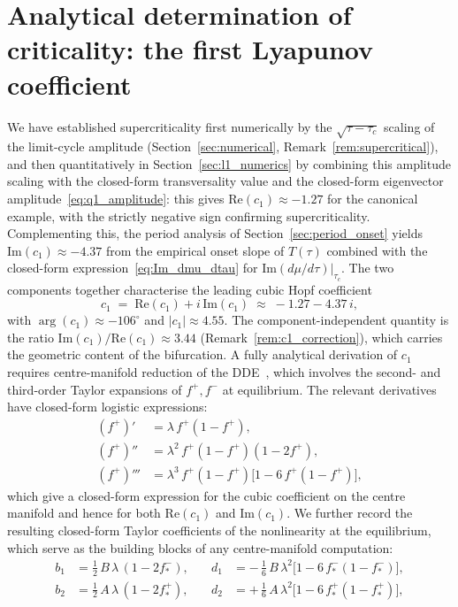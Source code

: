\documentclass[sn-mathphys,Numbered]{sn-jnl}
\theoremstyle{thmstyleone}
\theoremstyle{thmstyletwo}
\theoremstyle{thmstylethree}
\begin{document}
\section{Analytical determination of criticality: the first Lyapunov coefficient}
\label{sec:analytical_supercrit}

We have established supercriticality first numerically by the
$\sqrt{\tau-\tau_c}$ scaling of the limit-cycle amplitude
(Section~\ref{sec:numerical}, Remark~\ref{rem:supercritical}), and then
quantitatively in Section~\ref{sec:l1_numerics} by combining this
amplitude scaling with the closed-form transversality value and the
closed-form eigenvector amplitude~\eqref{eq:q1_amplitude}: this gives
$\mathrm{Re}(c_1)\approx -1.27$ for the canonical example, with the
strictly negative sign confirming supercriticality. Complementing this,
the period analysis of Section~\ref{sec:period_onset} yields
$\mathrm{Im}(c_1)\approx -4.37$ from the empirical onset slope of
$T(\tau)$ combined with the closed-form expression~\eqref{eq:Im_dmu_dtau}
for $\mathrm{Im}(d\mu/d\tau)|_{\tau_c}$. The two components together
characterise the leading cubic Hopf coefficient
\[
c_1 \;=\; \mathrm{Re}(c_1) + i\,\mathrm{Im}(c_1)
\;\approx\; -1.27 - 4.37\,i,
\]
with $\arg(c_1)\approx -106^\circ$ and $|c_1|\approx 4.55$. The
component-independent quantity is the ratio
$\mathrm{Im}(c_1)/\mathrm{Re}(c_1)\approx 3.44$
(Remark~\ref{rem:c1_correction}), which carries the geometric content
of the bifurcation. A fully analytical derivation of $c_1$ requires
centre-manifold reduction of the
DDE~\cite{hassard1981theory,kuang1993delay}, which involves the second-
and third-order Taylor expansions of $f^+,f^-$ at equilibrium. The
relevant derivatives have closed-form logistic expressions:
\begin{equation}
\begin{aligned}
(f^+)' &= \lambda\, f^+(1-f^+),\\
(f^+)'' &= \lambda^2\, f^+(1-f^+)(1-2 f^+),\\
(f^+)''' &= \lambda^3\, f^+(1-f^+)\bigl[1 - 6\,f^+(1-f^+)\bigr],
\end{aligned}
\label{eq:logistic_derivs}
\end{equation}
which give a closed-form expression for the cubic coefficient on the
centre manifold and hence for both $\mathrm{Re}(c_1)$ and
$\mathrm{Im}(c_1)$. We further record the resulting closed-form
Taylor coefficients of the nonlinearity at the equilibrium, which
serve as the building blocks of any centre-manifold computation:
\begin{equation}
\begin{aligned}
b_1 &= \tfrac{1}{2}\,B\,\lambda\,(1-2 f^-_*),
&\quad
d_1 &= -\,\tfrac{1}{6}\,B\,\lambda^{2}\bigl[1-6\,f^-_*(1-f^-_*)\bigr],
\\[3pt]
b_2 &= \tfrac{1}{2}\,A\,\lambda\,(1-2 f^+_*),
&\quad
d_2 &= +\,\tfrac{1}{6}\,A\,\lambda^{2}\bigl[1-6\,f^+_*(1-f^+_*)\bigr],
\end{aligned}
\label{eq:Taylor_coeffs}
\end{equation}
\end{document}
